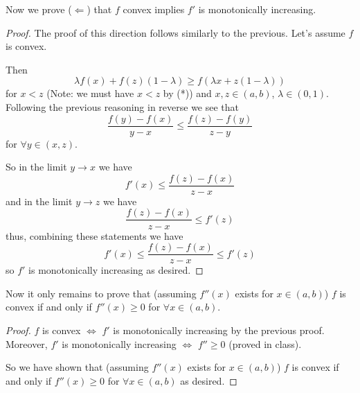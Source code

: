 \documentclass[12pt]{article}
\begin{document}
Now we prove ($\Leftarrow$) that  $f$ convex implies $f'$ is monotonically increasing.

\begin{proof}
The proof of this direction follows similarly to the previous. Let's assume $f$ is convex.

Then
\[ \lambda  f(x) + f(z)(1 - \lambda )  \geq f(\lambda x+ z(1  - \lambda )) \]
for $ x<z$ (Note: we must have $x<z$ by (*)) and $x,z \in (a,b)$, $\lambda \in (0,1)$. Following the previous reasoning in reverse we see that
\[\frac{f(y)-f(x)}{y-x} \leq \frac{f(z)-f(y)}{z-y}\]
for $\forall y \in (x,z)$. 

So in the limit $y \to x$ we have 
\[ f'(x) \leq \frac{f(z)-f(x)}{z-x}\] 
and in the limit $y \to z$ we have 
\[\frac{f(z)-f(x)}{z-x} \leq f'(z) \]
thus, combining these statements we have
\[ f'(x) \leq \frac{f(z)-f(x)}{z-x}  \leq f'(z) \]
so $f'$ is monotonically increasing as desired.\end{proof}

Now it only remains to prove that (assuming $f''(x)$ exists for $x \in (a,b)$) $f$ is convex if and only if $f''(x) \geq 0$ for $\forall x \in (a,b)$.

\begin{proof}
$f$ is convex $\Leftrightarrow$ $f'$ is monotonically increasing by the previous proof. Moreover, $f'$ is monotonically increasing $\Leftrightarrow$ $f''\geq 0$ (proved in class).

So we have shown that (assuming $f''(x)$ exists for $x \in (a,b)$) $f$ is convex if and only if $f''(x) \geq 0$ for $\forall x \in (a,b)$ as desired.\end{proof}
\end{document}
